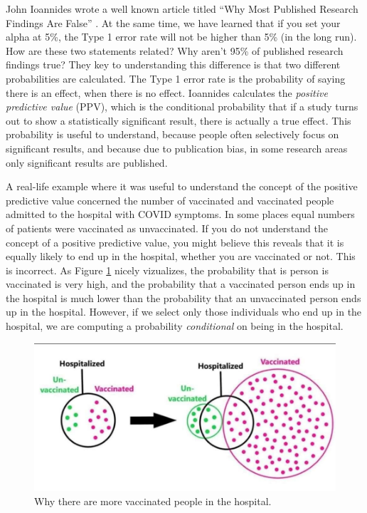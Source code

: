 \documentclass[
]{krantz}
\begin{document}
John Ioannides wrote a well known article titled ``Why Most Published Research Findings Are False'' \citep{ioannidis_why_2005}. At the same time, we have learned that if you set your alpha at 5\%, the Type 1 error rate will not be higher than 5\% (in the long run). How are these two statements related? Why aren't 95\% of published research findings true? They key to understanding this difference is that two different probabilities are calculated. The Type 1 error rate is the probability of saying there is an effect, when there is no effect. Ioannides calculates the \emph{positive predictive value} (PPV), which is the conditional probability that if a study turns out to show a statistically significant result, there is actually a true effect. This probability is useful to understand, because people often selectively focus on significant results, and because due to publication bias, in some research areas only significant results are published.

A real-life example where it was useful to understand the concept of the positive predictive value concerned the number of vaccinated and vaccinated people admitted to the hospital with COVID symptoms. In some places equal numbers of patients were vaccinated as unvaccinated. If you do not understand the concept of a positive predictive value, you might believe this reveals that it is equally likely to end up in the hospital, whether you are vaccinated or not. This is incorrect. As Figure \ref{fig:ppvhospital} nicely vizualizes, the probability that is person is vaccinated is very high, and the probability that a vaccinated person ends up in the hospital is much lower than the probability that an unvaccinated person ends up in the hospital. However, if we select only those individuals who end up in the hospital, we are computing a probability \emph{conditional} on being in the hospital.

\begin{figure}

{\centering \includegraphics[width=1\linewidth]{images/hospitalvaccinated} 

}

\caption{Why there are more vaccinated people in the hospital.}\label{fig:ppvhospital}
\end{figure}
\end{document}
